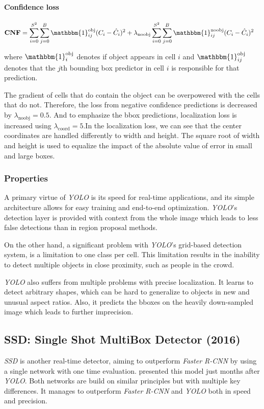 \paragraph{Confidence loss}
\begin{align*}
\mathbf{CNF} &= \sum_{i=0}^{S^2} \sum_{j=0}^B \mathbbm{1}_{ij}^{\text{obj}} (C_i - \hat{C}_i)^2 
+ \lambda_{\text{noobj}} \sum_{i=0}^{S^2} \sum_{j=0}^B \mathbbm{1}_{ij}^{\text{noobj}} (C_i - \hat{C}_i)^2
\end{align*}

\noindent where $\mathbbm{1}^{\text{obj}}_i$ denotes if object appears in cell $i$ and $\mathbbm{1}^{\text{obj}}_{ij}$ denotes that the $j$th bounding box predictor in cell $i$ is responsible for that prediction.

The gradient of cells that do contain the object can be overpowered with the cells that do not.  Therefore, the loss from negative confidence predictions is decreased by $\lambda_{\text{noobj}} = 0.5$. And to emphasize the bbox predictions, localization loss is increased using $\lambda_{\text{coord}} = 5$.In the localization loss, we can see that the center coordinates are handled differently to width and height. The square root of width and height is used to equalize the impact of the absolute value of error in small and large boxes.


\subsubsection{Properties}
A primary virtue of \textit{YOLO} is its speed for real-time applications, and its simple architecture allows for easy training and end-to-end optimization. \textit{YOLO}'s detection layer is provided with context from the whole image which leads to less false detections than in region proposal methods. 

On the other hand, a significant problem with \textit{YOLO}'s grid-based detection system, is a limitation to one class per cell. This limitation results in the inability to detect multiple objects in close proximity, such as people in the crowd. 

\textit{YOLO} also suffers from multiple problems with precise localization. It learns to detect arbitrary shapes, which can be hard to generalize to objects in new and unusual aspect ratios. Also, it predicts the bboxes on the heavily down-sampled image which leads to further imprecision. 


\subsection{SSD: Single Shot MultiBox Detector (2016)}
\label{sec:ssd}
\textit{SSD} is another real-time detector, aiming to outperform \textit{Faster R-CNN} by using a single network with one time evaluation. \citeauthor{bib:ssd} \cite{bib:ssd} presented this model just months after \textit{YOLO}. Both networks are build on similar principles but with multiple key differences. It manages to outperform \textit{Faster R-CNN} and \textit{YOLO} both in speed and precision.

